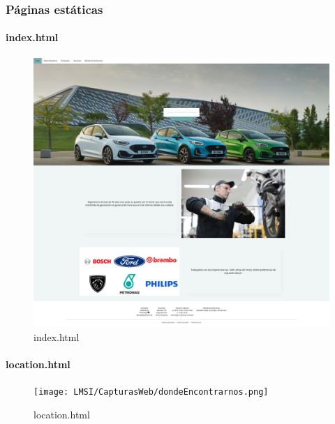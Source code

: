 \documentclass{article}
\begin{document}
\subsubsection{Páginas estáticas}
\paragraph{index.html}
\begin{figure}[H]
  \centering
  \includegraphics[width=1.0\textwidth]{LMSI/CapturasWeb/index.png}
  \caption{index.html}
\end{figure}
\paragraph{location.html}
\begin{figure}[H]
  \centering
  \texttt{[image: LMSI/CapturasWeb/dondeEncontrarnos.png]}
  \caption{location.html}
\end{figure}
\end{document}
